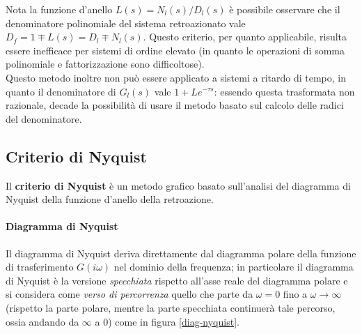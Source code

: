 		Nota la funzione d'anello $L(s) = N_l(s) / D_l(s)$ è possibile osservare che il denominatore polinomiale del sistema retroazionato vale $D_f = 1 \mp L(s) = D_l \mp N_l(s)$. Questo criterio, per quanto applicabile, risulta essere inefficace per sistemi di ordine elevato (in quanto le operazioni di somma polinomiale e fattorizzazione sono difficoltose).\\
		Questo metodo inoltre non può essere applicato a sistemi a ritardo di tempo, in quanto il denominatore di $G_l(s)$ vale $1+Le^{-\tau s}$: essendo questa trasformata non razionale, decade la possibilità di usare il metodo basato sul calcolo delle radici del denominatore.
		
	
	\subsection{Criterio di Nyquist}
		
		\begin{concetto}
			Il \textbf{criterio di Nyquist} è un metodo grafico basato sull'analisi del diagramma di Nyquist della funzione d'anello della retroazione.
		\end{concetto}
		
		\paragraph{Diagramma di Nyquist} Il diagramma di Nyquist deriva direttamente dal diagramma polare della funzione di trasferimento $G(i\omega)$ nel dominio della frequenza; in particolare il diagramma di Nyquist è la versione \textit{specchiata} rispetto all'asse reale del diagramma polare e si considera come \textit{verso di percorrenza} quello che parte da $\omega= 0$ fino a $\omega\rightarrow \infty$ (rispetto la parte polare, mentre la parte specchiata continuerà tale percorso, ossia andando da $\infty$ a 0) come in figura \ref{diag-nyquist}.
		
		
